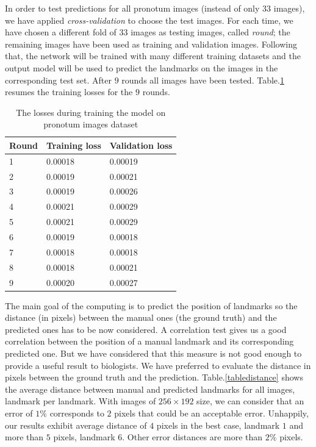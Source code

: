 \documentclass[10pt]{article}
\begin{document}
In order to test predictions for all pronotum images (instead of only $33$ images),
we have applied \textit{cross-validation} to choose the test images. For each time,
we have chosen a different fold of $33$ images as testing images, called \textit{round};
the remaining images have been used as training and validation images. Following that, the network will be trained with many
different training datasets and the output model will be used to
predict the landmarks on the images in the corresponding test
set. After $9$ rounds all images have been
tested. Table.\ref{tbltrainingloss} resumes the training losses for
the $9$ rounds.

\begin{table}[h!]
	\centering
	\begin{tabular}{l l l}
	Round & Training loss & Validation loss \\ \hline
	1 & 0.00018 & 0.00019  \\ \hline
	2 & 0.00019 & 0.00021 \\ \hline
	3 & 0.00019 & 0.00026 \\ \hline
	4 & 0.00021 & 0.00029 \\ \hline
	5 & 0.00021 & 0.00029 \\ \hline
	6 & 0.00019 & 0.00018 \\ \hline
	7 & 0.00018 & 0.00018 \\ \hline
	8 & 0.00018 & 0.00021 \\ \hline
	9 & 0.00020 & 0.00027 \\ \hline
	\end{tabular}
	\caption{\small{The losses during training the model on pronotum images dataset}}
	\label{tbltrainingloss}
\end{table}

The main goal of the computing is to predict the position of landmarks so
the distance (in pixels) between the manual ones (the ground truth)
and the predicted ones has to be now considered. A correlation test
gives us a good correlation between the position of a manual landmark and
its corresponding predicted one. But we have considered that this
measure is not good enough to provide a useful result to biologists. We
have preferred to evaluate the distance in pixels between the ground
truth and the prediction. Table.\ref{tabledistance} shows the
average distance between manual and predicted landmarks for all
images, landmark per landmark. With images of $256 \times 192$ size, we
can consider that an error of $1\%$ corresponds to $2$ pixels that
could be an acceptable error. Unhappily, our results exhibit
average distance of $4$ pixels in the best case, landmark $1$ and more
than $5$ pixels, landmark $6$. Other error distances are more than $2\%$
pixels.
\end{document}
